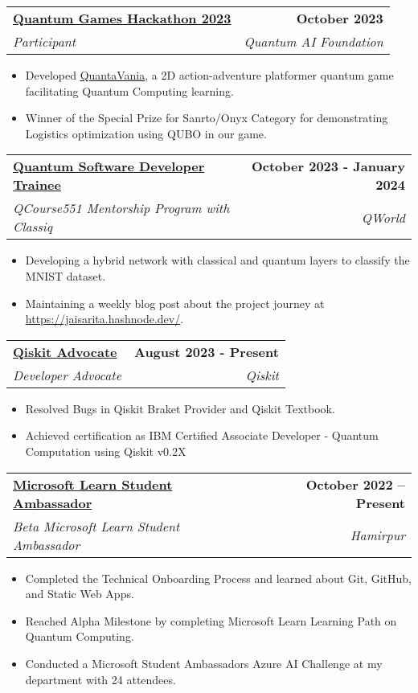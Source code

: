 \documentclass[letterpaper,11pt]{article}
\makeatletter
\newcommand{\resumeItem}[1]{
    \item\small{
        {#1 \vspace{-2pt}}
    }
}
\newcommand{\resumeSubheading}[4]{
    \vspace{-2pt}\item
        \begin{tabular*}{1.0\textwidth}[t]{l@{\extracolsep{\fill}}r}
            \textbf{#1} & \textbf{\small #2} \\
            \textit{\small#3} & \textit{\small #4} \\
        \end{tabular*}
        \vspace{-7pt}
}
\newcommand{\resumeItemListStart}{\begin{itemize}}
\newcommand{\resumeItemListEnd}{\end{itemize}\vspace{-5pt}}
\makeatother
\begin{document}
        \resumeSubheading
            {\href{https://www.qaif.org/contests/quantum-games-hackathon}{Quantum Games Hackathon 2023}}{October 2023}
            {Participant}{Quantum AI Foundation}
            \vspace{-6pt}
            \resumeItemListStart
                \resumeItem{Developed \underline{\href{https://github.com/devilkiller-ag/QuantaVania}{QuantaVania}}, a 2D action-adventure platformer quantum game facilitating Quantum Computing learning.}
                \resumeItem{Winner of the Special Prize for Sanrto/Onyx Category for demonstrating Logistics optimization using QUBO in our game.}
            \resumeItemListEnd
        
        \resumeSubheading
            {\href{https://qworld.net/qcourse551-1/}{Quantum Software Developer Trainee}}{October 2023 - January 2024}
            {QCourse551 Mentorship Program with Classiq}{QWorld}
            \vspace{-6pt}
            \resumeItemListStart
                \resumeItem{Developing a hybrid network with classical and quantum layers to classify the MNIST dataset.}
                \resumeItem{Maintaining a weekly blog post about the project journey at \underline{\href{https://jaisarita.hashnode.dev/reflection-on-my-quantum-software-developer-journey-at-qworld-classiq-implementing-quantum-neural-network-algorithm}{https://jaisarita.hashnode.dev/}}.}
            \resumeItemListEnd
  
        \resumeSubheading
            {\href{https://qiskit.org/advocates}{Qiskit Advocate}}{August 2023 - Present}
            {Developer Advocate}{Qiskit}
            \vspace{-6pt}
            \resumeItemListStart
                \resumeItem{Resolved Bugs in Qiskit Braket Provider and Qiskit Textbook.}
                \resumeItem{Achieved certification as IBM Certified Associate Developer - Quantum Computation using Qiskit v0.2X}
            \resumeItemListEnd

        \resumeSubheading
            {\href{https://studentambassadors.microsoft.com/en-US/studentambassadors/profile/5712f83a-b4c5-4033-b77a-a5ce2bbd6ea3}
            {Microsoft Learn Student Ambassador}}{October 2022 -- Present}
            {Beta Microsoft Learn Student Ambassador}{Hamirpur}
            \vspace{-6pt}
            \resumeItemListStart
                \resumeItem{Completed the Technical Onboarding Process and learned about Git, GitHub, and Static Web Apps.}
                \resumeItem{Reached Alpha Milestone by completing Microsoft Learn Learning Path on Quantum Computing.}
                \resumeItem{Conducted a Microsoft Student Ambassadors Azure AI Challenge at my department with 24 attendees.}
                \resumeItemListEnd
            
\end{document}
